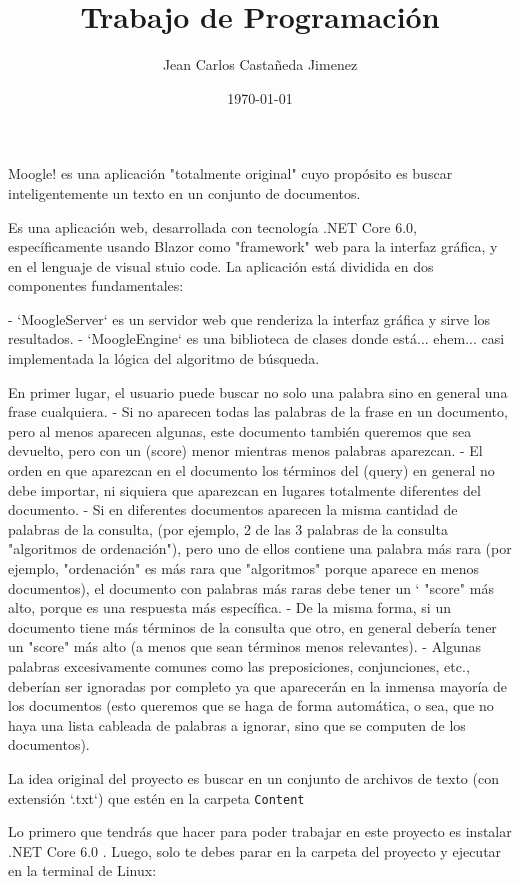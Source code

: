 \documentclass{article}
\title{Trabajo de Programación}
\author{Jean Carlos Castañeda Jimenez}
\date{\today}
\begin{document}
\maketitle

Moogle! es una aplicación "totalmente original" cuyo propósito es buscar inteligentemente un texto en un conjunto de documentos.

Es una aplicación web, desarrollada con tecnología .NET Core 6.0, específicamente usando Blazor como "framework" web para la interfaz gráfica, y en el lenguaje de visual stuio code.
La aplicación está dividida en dos componentes fundamentales:

- `MoogleServer` es un servidor web que renderiza la interfaz gráfica y sirve los resultados.
- `MoogleEngine` es una biblioteca de clases donde está... ehem... casi implementada la lógica del algoritmo de búsqueda.

 En primer lugar, el usuario puede buscar no solo una palabra sino en general una frase cualquiera.
- Si no aparecen todas las palabras de la frase en un documento, pero al menos aparecen algunas, este documento también queremos que sea devuelto, pero con un (score) menor mientras menos palabras aparezcan.
- El orden en que aparezcan en el documento los términos del (query) en general no debe importar, ni siquiera que aparezcan en lugares totalmente diferentes del documento.
- Si en diferentes documentos aparecen la misma cantidad de palabras de la consulta, (por ejemplo, 2 de las 3 palabras de la consulta "algoritmos de ordenación"), pero uno de ellos contiene una palabra más rara (por ejemplo, "ordenación" es más rara que "algoritmos" porque aparece en menos documentos), el documento con palabras más raras debe tener un `
"score" más alto, porque es una respuesta más específica.
- De la misma forma, si un documento tiene más términos de la consulta que otro, en general debería tener un "score" más alto (a menos que sean términos menos relevantes).
- Algunas palabras excesivamente comunes como las preposiciones, conjunciones, etc., deberían ser ignoradas por completo ya que aparecerán en la inmensa mayoría de los documentos (esto queremos que se haga de forma automática, o sea, que no haya una lista cableada de palabras a ignorar, sino que se computen de los documentos).

La idea original del proyecto es buscar en un conjunto de archivos de texto (con extensión `.txt`) que estén en la carpeta {\tt Content}


Lo primero que tendrás que hacer para poder trabajar en este proyecto es instalar .NET Core 6.0 . Luego, solo te debes parar en la carpeta del proyecto y ejecutar en la terminal de Linux:
\end{document}
